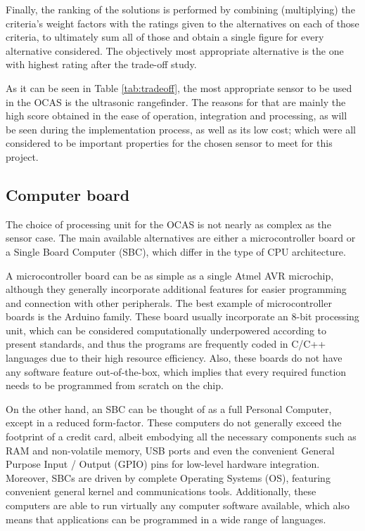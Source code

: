 Finally, the ranking of the solutions is performed by combining (multiplying) the criteria's weight factors with the ratings given to the alternatives on each of those criteria, to ultimately sum all of those and obtain a single figure for every alternative considered.
The objectively most appropriate alternative is the one with highest rating after the trade-off study.



As it can be seen in Table \ref{tab:tradeoff}, the most appropriate sensor to be used in the OCAS is the ultrasonic rangefinder.
The reasons for that are mainly the high score obtained in the ease of operation, integration and processing, as will be seen during the implementation process, as well as its low cost; which were all considered to be important properties for the chosen sensor to meet for this project.



\subsection{Computer board}

The choice of processing unit for the OCAS is not nearly as complex as the sensor case.
The main available alternatives are either a microcontroller board or a Single Board Computer (SBC), which differ in the type of CPU architecture.

A microcontroller board can be as simple as a single Atmel AVR microchip, although they generally incorporate additional features for easier programming and connection with other peripherals.
The best example of microcontroller boards is the Arduino family.
These board usually incorporate an 8-bit processing unit, which can be considered computationally underpowered according to present standards, and thus the programs are frequently coded in C/C++ languages due to their high resource efficiency.
Also, these boards do not have any software feature out-of-the-box, which implies that every required function needs to be programmed from scratch on the chip.

On the other hand, an SBC can be thought of as a full Personal Computer, except in a reduced form-factor.
These computers do not generally exceed the footprint of a credit card, albeit embodying all the necessary components such as RAM and non-volatile memory, USB ports and even the convenient General Purpose Input / Output (GPIO) pins for low-level hardware integration.
Moreover, SBCs are driven by complete Operating Systems (OS), featuring convenient general kernel and communications tools.
Additionally, these computers are able to run virtually any computer software available, which also means that applications can be programmed in a wide range of languages. 

